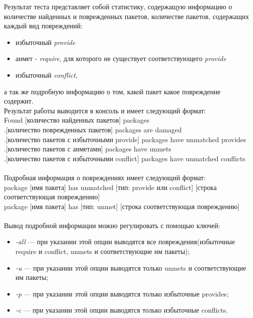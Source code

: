 Результат теста представляет собой статистику, содержащую информацию 
о количестве найденных и поврежденных пакетов, количестве пакетов, содержащих
каждый вид повреждений:\\
\begin{itemize}
\item{избыточный \textit{provide}}
\item{анмет - \textit{require}, для которого не существует соответствующего \textit{provide}}
\item{избыточный \textit{conflict}},
\end{itemize}
а так же подробную информацию о том, какой пакет какое повреждение содержит.\\
Результат работы выводится в консоль и имеет следующий формат:\\
Found [количество найденных пакетов] packages\\
.[количество поврежденных пакетов] packages are damaged\\
.[количество пакетов с избыточными provide] packages have unmatched provides\\
.[количество пакетов с анметами] packages have unmets\\
.[количество пакетов с избыточными conflict] packages have unmatched conflicts\\
\\
Подробная информация о повреждениях имеет следующий формат:\\
package [имя пакета] has unmatched [тип: provide или conflict] [строка соответствующая повреждению]\\
package [имя пакета] has [тип: unmet] [строка соответствующая повреждению]\\
\\
Вывод подробной информации можно регулировать с помощью ключей:\\
\begin{itemize}
\item{\emph{-all} --- при указании этой опции выводятся все повреждения(избыточные require и conflict, unmets и
соответствующие им пакеты);}
\item{\emph{-u} --- при указании этой опции выводятся только unmets и соответствующие им пакеты;}
\item{\emph{-p} --- при указании этой опции выводятся только  избыточные provides;}
\item{\emph{-c} --- при указании этой опции выводятся только избыточные conflicts.}
\end{itemize}

